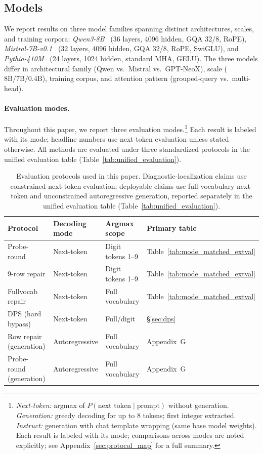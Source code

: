 \documentclass{article}
\begin{document}
\subsection{Models}

We report results on three model families spanning distinct architectures, scales, and training corpora:
\emph{Qwen3-8B}~\citep{qwen3} (36 layers, 4096 hidden, GQA 32/8, RoPE),
\emph{Mistral-7B-v0.1}~\citep{jiang2023mistral} (32 layers, 4096 hidden, GQA 32/8, RoPE, SwiGLU),
and \emph{Pythia-410M}~\citep{biderman2023pythia} (24 layers, 1024 hidden, standard MHA, GELU).
The three models differ in architectural family (Qwen vs.\ Mistral vs.\ GPT-NeoX),
scale ($8\text{B} / 7\text{B} / 0.4\text{B}$), training corpus, and attention pattern
(grouped-query vs.\ multi-head).

\paragraph{Evaluation modes.}
Throughout this paper, we report three evaluation modes.\footnote{%
  \emph{Next-token:} argmax of $P(\text{next token} \mid \text{prompt})$ without generation.
  \emph{Generation:} greedy decoding for up to 8 tokens; first integer extracted.
  \emph{Instruct:} generation with chat template wrapping (same base model weights).
  Each result is labeled with its mode; comparisons across modes are noted explicitly; see Appendix~\ref{sec:protocol_map} for a full summary.}
Each result is labeled with its mode; headline numbers use next-token evaluation unless stated otherwise.
All methods are evaluated under three standardized protocols in the unified evaluation table (Table~\ref{tab:unified_evaluation}).

\begin{table}[t]
\caption{Evaluation protocols used in this paper. Diagnostic-localization claims use constrained next-token evaluation; deployable claims use full-vocabulary next-token and unconstrained autoregressive generation, reported separately in the unified evaluation table (Table~\ref{tab:unified_evaluation}).}
\label{tab:protocol_map}
\begin{tabular}{llll}
\toprule
Protocol & Decoding mode & Argmax scope & Primary table \\
\midrule
Probe-round & Next-token & Digit tokens 1--9 & Table~\ref{tab:mode_matched_extval} \\
9-row repair & Next-token & Digit tokens 1--9 & Table~\ref{tab:mode_matched_extval} \\
Fullvocab repair & Next-token & Full vocabulary & Table~\ref{tab:mode_matched_extval} \\
DPS (hard bypass) & Next-token & Full/digit & \S\ref{sec:dps} \\
Row repair (generation) & Autoregressive & Full vocabulary & Appendix~G \\
Probe-round (generation) & Autoregressive & Full vocabulary & Appendix~G \\
\bottomrule
\end{tabular}
\end{table}
\end{document}
